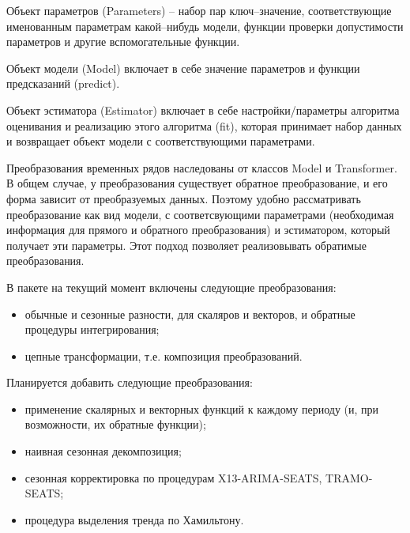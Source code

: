 \documentclass[a4paper,14pt]{extreport}
\begin{document}
	
	Объект параметров (Parameters) -- набор пар ключ--значение, соответствующие именованным параметрам какой--нибудь модели, функции проверки допустимости параметров и другие вспомогательные функции.
	
	Объект модели (Model) включает в себе значение параметров и функции предсказаний (predict).
	
	Объект эстиматора (Estimator) включает в себе настройки/параметры алгоритма оценивания и реализацию этого алгоритма (fit), которая принимает набор данных и возвращает объект модели с соответствующими параметрами.
	
	
	Преобразования временных рядов наследованы от классов Model и Transformer. В общем случае, у преобразования существует обратное преобразование, и его форма зависит от преобразуемых данных. Поэтому удобно рассматривать преобразование как вид модели, с соответсвующими параметрами (необходимая информация для прямого и обратного преобразования) и эстиматором, который получает эти параметры. Этот подход позволяет реализовывать обратимые преобразования.
	
	В пакете на текущий момент включены следующие преобразования:
	\begin{itemize}
		\item обычные и сезонные разности, для скаляров и векторов, и обратные процедуры интегрирования;
		\item цепные трансформации, т.е. композиция преобразований.
	\end{itemize}
	
	Планируется добавить следующие преобразования:
	\begin{itemize}
		\item применение скалярных и векторных функций к каждому периоду (и, при возможности, их обратные функции);
		\item наивная сезонная декомпозиция;
		\item сезонная корректировка по процедурам X13-ARIMA-SEATS, TRAMO-SEATS;
		\item процедура выделения тренда по Хамильтону.
	\end{itemize}
	
\end{document}
